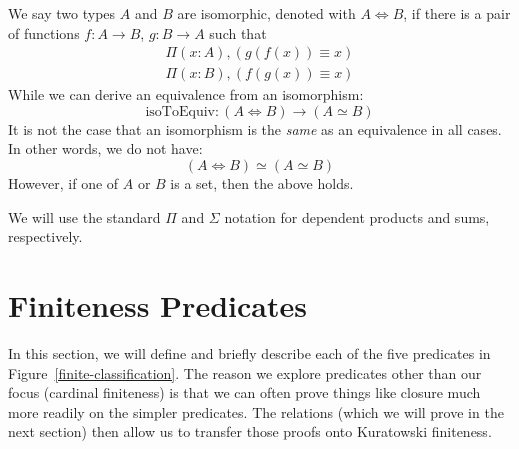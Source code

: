\begin{romdefinition}[Isomorphism]
  We say two types \(A\) and \(B\) are isomorphic, denoted with \(A \iff B\), if
  there is a pair of functions \(f : A \rightarrow B\), \(g : B \rightarrow A\)
  such that
  \begin{equation}
    \begin{aligned}
      \Pi(x : A) , (g(f(x)) \equiv x) \\
      \Pi(x : B) , (f(g(x)) \equiv x)
    \end{aligned}
  \end{equation}
  While we can derive an equivalence from an isomorphism:
  \begin{equation}
    \text{isoToEquiv} : (A \iff B) \rightarrow (A \simeq B)
  \end{equation}
  It is not the case that an isomorphism is the \emph{same} as an equivalence in
  all cases.
  In other words, we do not have:
  \begin{equation}
    (A \iff B) \simeq (A \simeq B)
  \end{equation}
  However, if one of \(A\) or \(B\) is a set, then the above holds.
\end{romdefinition}




We will use the standard \(\Pi\) and \(\Sigma\) notation for dependent products
and sums, respectively.

\section{Finiteness Predicates}
In this section, we will define and briefly describe each of the five predicates
in Figure~\ref{finite-classification}.
The reason we explore predicates other than our focus (cardinal finiteness) is
that we can often prove things like closure much more readily on the simpler
predicates.
The relations (which we will prove in the next section) then allow us to
transfer those proofs onto Kuratowski finiteness.
